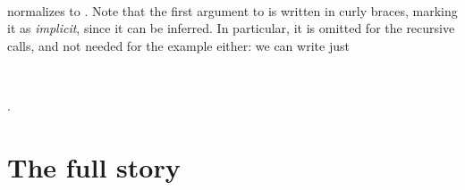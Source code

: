 \documentclass[fleqn,runningheads]{llncs}
\begin{document}
\begin{code}%
\>[0][@{}l@{\AgdaIndent{1}}]%
\>[2]\AgdaSpace{}%
\AgdaSymbol{\{}\AgdaSpace{}%
\AgdaSpace{}%
\AgdaSymbol{\}}\AgdaSpace{}%
\AgdaSymbol{(}\AgdaSpace{}%
\AgdaSymbol{)}\AgdaSpace{}%
\AgdaSymbol{(}\AgdaSpace{}%
\AgdaSymbol{(}\AgdaSpace{}%
\AgdaOperator{\AgdaInductiveConstructor{,}}\AgdaSpace{}%
\AgdaSymbol{))}\<%
\end{code}
\begin{code}[hide]%
%
\>[2]\AgdaSpace{}%
\<%
\\
\>[0]\AgdaSpace{}%
\AgdaSymbol{=}\AgdaSpace{}%
\<%
\end{code}
normalizes to .
%
Note that the first argument to  is written in curly braces, marking it as \emph{implicit}, since it can be inferred. In particular, it is omitted for the recursive calls, and not needed for the example either: we can write just
\begin{code}[hide]%
\>[0]\AgdaSpace{}%
\AgdaSymbol{:}\AgdaSpace{}%
\<%
\\
\>[0]\AgdaSpace{}%
\AgdaSymbol{=}\<%
\end{code}
\begin{code}[inline]%
\>[0][@{}l@{\AgdaIndent{1}}]%
\>[2]\AgdaSpace{}%
\AgdaSymbol{(}\AgdaSpace{}%
\AgdaSymbol{)}\AgdaSpace{}%
\AgdaSymbol{(}\AgdaSpace{}%
\AgdaSymbol{(}\AgdaSpace{}%
\AgdaOperator{\AgdaInductiveConstructor{,}}\AgdaSpace{}%
\AgdaSymbol{))}\<%
\end{code}.

\section{The full story}

\begin{code}[hide]%
\>[0]\<%
\\
\>[0][@{}l@{\AgdaIndent{0}}]%
\>[2]\AgdaSpace{}%
\AgdaSpace{}%
\AgdaSpace{}%
\AgdaSpace{}%
\AgdaSymbol{:}\AgdaSpace{}%
\<%
\end{code}
\end{document}

